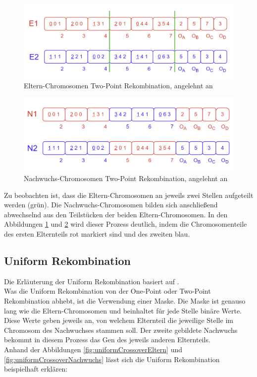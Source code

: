\begin{figure}[H]
    \centering
    \includegraphics[scale = 0.5]{Bilder/BeispielTwoPointCrossover.png}
    \caption{Eltern-Chromosomen Two-Point Rekombination, angelehnt an \cite{torabi_using_2022}}
    \label{fig:twoPointCrossoverEltern}
\end{figure}
\begin{figure}[H]
    \centering
    \includegraphics[scale = 0.5]{Bilder/BeispielTwoPointCrossover2.png}
    \caption{Nachwuchs-Chromosomen Two-Point Rekombination, angelehnt an \cite{torabi_using_2022}}
    \label{fig:twoPointCrossoverNachwuchs}
\end{figure}

Zu beobachten ist, dass die Eltern-Chromosomen an jeweils zwei Stellen aufgeteilt werden (grün).
Die Nachwuchs-Chromosomen bilden sich anschließend abwechselnd aus den Teilstücken der beiden Eltern-Chromosomen.
In den Abbildungen \ref{fig:twoPointCrossoverEltern} und \ref{fig:twoPointCrossoverNachwuchs} wird dieser Prozess deutlich, indem die Chromosomenteile des ersten Elternteils rot markiert sind und des zweiten blau.


\subsection{Uniform Rekombination}
\label{subsubsec:unformCrossover}
Die Erläuterung der Uniform Rekombination basiert auf \cite{syswerda_uniform_1989}.\\
Was die Uniform Rekombination von der One-Point oder Two-Point Rekombination abhebt, ist die Verwendung einer Maske. 
Die Maske ist genauso lang wie die Eltern-Chromosomen und beinhaltet für jede Stelle binäre Werte.
Diese Werte geben jeweils an, von welchem Elternteil die jeweilige Stelle im Chromosom des Nachwuchses stammen soll.
Der zweite gebildete Nachwuchs bekommt in diesem Prozess das Gen des jeweils anderen Elternteils.\\
Anhand der Abbildungen \ref{fig:uniformCrossoverEltern} und \ref{fig:uniformCrossoverNachwuchs} lässt sich die Uniform Rekombination beispielhaft erklären:

